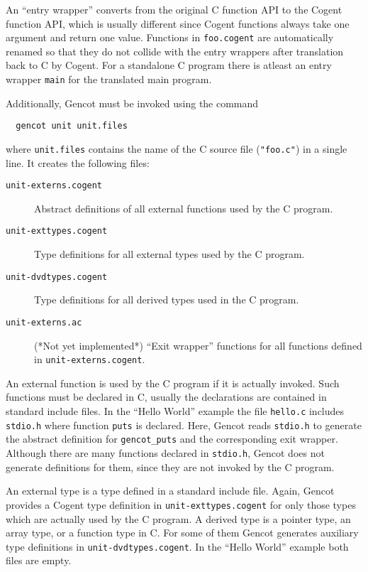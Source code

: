 \documentclass[a4paper]{report}
\newcommand{\code}[1]{\textnormal{\texttt{#1}}}
\begin{document}
An ``entry wrapper'' converts from the original C function API to the Cogent function API, which is usually different 
since Cogent functions always take one argument and return one value. Functions in \code{foo.cogent} are automatically
renamed so that they do not collide with the entry wrappers after translation back to C by Cogent. For a standalone
C program there is atleast an entry wrapper \code{main} for the translated main program.

Additionally, Gencot must be invoked using the command
\begin{verbatim}
  gencot unit unit.files
\end{verbatim}
where \code{unit.files} contains the name of the C source file (\code{"foo.c"}) in a single line. It creates the following
files:
\begin{description}
\item[\code{unit-externs.cogent}] Abstract definitions of all external functions used by the C program.
\item[\code{unit-exttypes.cogent}] Type definitions for all external types used by the C program.
\item[\code{unit-dvdtypes.cogent}] Type definitions for all derived types used in the C program.
\item[\code{unit-externs.ac}] (*Not yet implemented*) ``Exit wrapper'' functions for all functions defined in 
\code{unit-externs.cogent}.
\end{description}
An external function is used by the C program if it is actually invoked. Such functions must be declared in C, usually
the declarations are contained in standard include files. In the ``Hello World'' example the file \code{hello.c} includes
\code{stdio.h} where function \code{puts} is declared. Here, Gencot reads \code{stdio.h} to generate the abstract definition for
\code{gencot\_puts} and the corresponding exit wrapper. Although there are many functions declared in \code{stdio.h}, Gencot
does not generate definitions for them, since they are not invoked by the C program.

An external type is a type defined in a standard include file. Again, Gencot provides a Cogent type definition in 
\code{unit-exttypes.cogent} for only those 
types which are actually used by the C program. A derived type is a pointer type, an array type, or a function type in C. For 
some of them Gencot generates auxiliary type definitions in \code{unit-dvdtypes.cogent}. In the ``Hello World'' example 
both files are empty.
\end{document}
